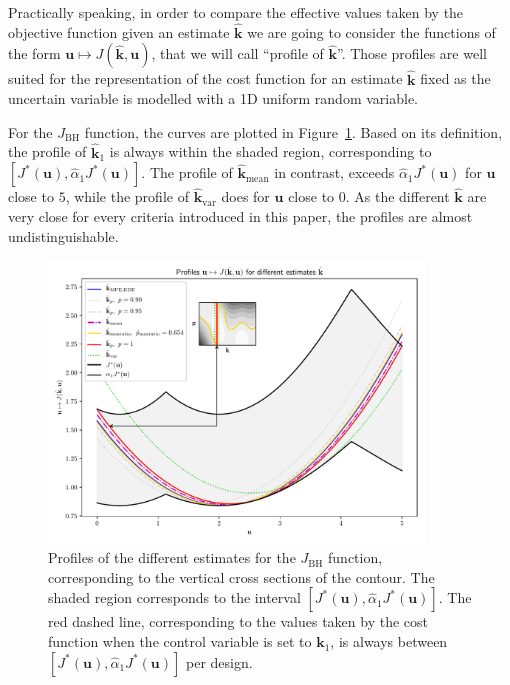 \documentclass[preprint, 1p]{elsarticle}
\newcommand{\hatkmean}{\hat{\mathbf{k}}_{\mathrm{mean}}}
\newcommand{\hatkvar}{\hat{\mathbf{k}}_{\mathrm{var}}}
\newcommand{\kest}{\hat{\mathbf{k}}}
\newcommand{\checka}{{\alpha}}
\newcommand{\checkk}{\mathbf{k}}
\begin{document}
Practically speaking, in order to compare the effective values taken by the objective function given an estimate $\kest$ we are going to consider the functions of the form $\mathbf{u} \mapsto J(\kest,\mathbf{u})$, that we will call ``profile of $\kest$''. Those profiles are well suited for the representation of the cost function for an estimate $\kest$ fixed as the uncertain variable is modelled with a 1D uniform random variable.

For the $J_{\mathrm{BH}}$ function, the curves are plotted in Figure~\ref{fig:profiles_branin}. Based on its definition, the profile of $\hat{\checkk}_1$ is always within the shaded region, corresponding to $[J^*(\mathbf{u}), \hat{\checka}_1 J^*(\mathbf{u})]$. The profile of $\hatkmean$ in contrast, exceeds $\hat{\checka}_1 J^*(\mathbf{u})$ for $\mathbf{u}$ close to $5$, while the profile of $\hatkvar$ does for $\mathbf{u}$ close to $0$.
As the different $\kest$ are very close for every criteria introduced in this paper, the profiles are almost undistinguishable.

\begin{figure}[t]
  \centering
\includegraphics[width=10cm]{Figures/profile_BH_all_estimates_noku.pdf}
\caption{Profiles of the different estimates for the $J_{\mathrm{BH}}$ function, corresponding to the vertical cross sections of the contour. The shaded region corresponds to the interval $[J^*(\mathbf{u}), \hat{\checka}_1 J^*(\mathbf{u})]$. The red dashed line, corresponding to the values taken by the cost function when the control variable is set to $\mathbf{k}_1$, is always between $[J^*(\mathbf{u}), \hat{\checka}_1 J^*(\mathbf{u})]$ per design.}
\label{fig:profiles_branin}
\end{figure}
\end{document}
